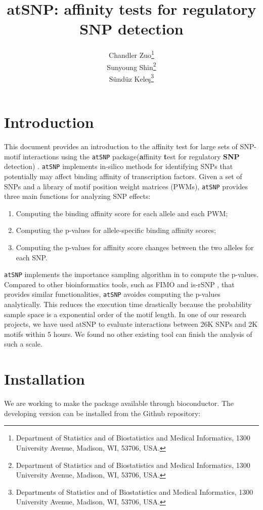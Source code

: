\documentclass[a4paper,10pt]{article}
\title{atSNP: affinity tests for regulatory SNP detection}
\author{Chandler Zuo\footnote{Department of Statistics and of Biostatistics and Medical Informatics, 1300 University Avenue, Madison, WI, 53706, USA.}\\
Sunyoung Shin\footnote{Department of Statistics and of Biostatistics and Medical Informatics, 1300 University Avenue, Madison, WI, 53706, USA.}  \\
S\"und\"uz Kele\c{s}\footnote{Departments of Statistics and of Biostatistics and Medical Informatics, 1300 University Avenue, Madison, WI, 53706, USA.}}
\date{}
\begin{document}
\maketitle

\tableofcontents

\section{Introduction}

This document provides an introduction to the affinity test for large sets of SNP-motif interactions using the \texttt{atSNP} package(\textbf{a}ffinity \textbf{t}est for regulatory \textbf{SNP} detection) \cite{zuo14}. \texttt{atSNP} implements in-silico methods for identifying SNPs that potentially may affect binding affinity of transcription factors. Given a set of SNPs and a library of motif position weight matrices (PWMs), \texttt{atSNP} provides three main functions for analyzing SNP effects:

\begin{enumerate}
\item Computing the binding affinity score for each allele and each PWM;
\item Computing the p-values for allele-specific binding affinity scores;
\item Computing the p-values for affinity score changes between the two alleles for each SNP.
\end{enumerate}

\texttt{atSNP} implements the importance sampling algorithm in \cite{isample} to compute the p-values. Compared to other bioinformatics tools, such as FIMO \cite{fimo} and is-rSNP \cite{is-rsnp}, that provides similar functionalities, \texttt{atSNP} avoides computing the p-values analytically. This reduces the execution time drastically because the probability sample space is a exponential order of the motif length. In one of our research projects, we have used atSNP to evaluate interactions between 26K SNPs and 2K motifs within 5 hours. We found no other existing tool can finish the analysis of such a scale.

\section{Installation}

We are working to make the package available through bioconductor. The developing version can be installed from the Github repository:
\end{document}
